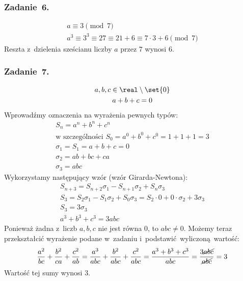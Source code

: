 \subsubsection*{Zadanie~6.}
\begin{gather*}
    a \equiv 3 \pmod{7}\\
    a^3 \equiv 3^3 \equiv 27 \equiv 21 + 6 \equiv 7 \cdot 3 + 6 \pmod{7}
\end{gather*}
Reszta z~dzielenia sześcianu liczby \(a\) przez \(7\) wynosi \(6\).
\subsubsection*{Zadanie~7.}
\begin{gather*}
    a, b, c \in \real \setminus \set{0}\\
    a + b + c = 0
\end{gather*}
Wprowadźmy oznaczenia na wyrażenia pewnych typów:
\begin{gather*}
    S_n = a^n + b^n + c^n\\
    \text{w~szczególności } S_0 = a^0 + b^0 + c^0 = 1 + 1 + 1 = 3\\
    \sigma_1 = S_1 = a + b + c = 0\\
    \sigma_2 = ab + bc + ca\\
    \sigma_3 = abc
\end{gather*}
Wykorzystamy następujący wzór (wzór Girarda-Newtona):
\begin{gather*}
    S_{n+3} = S_{n+2}\sigma_1 - S_{n+1}\sigma_2 + S_{n}\sigma_3\\
    S_3 = S_2\sigma_1 - S_1\sigma_2 + S_0\sigma_3 = S_2 \cdot 0 + 0 \cdot \sigma_2 + 3\sigma_3\\
    S_3 = 3\sigma_3\\
    a^3 + b^3 + c^3 = 3abc
\end{gather*}
Ponieważ żadna z~liczb \(a, b, c\) nie jest równa \(0\), to \(abc \neq 0\). Możemy teraz przekształcić wyrażenie podane w~zadaniu i~podstawić wyliczoną wartość:
\begin{gather*}
    \frac{a^2}{bc} + \frac{b^2}{ca} + \frac{c^2}{ab}
        = \frac{a^3}{abc} + \frac{b^2}{abc} + \frac{c^2}{abc}
        = \frac{a^3 + b^3 + c^3}{abc}
        = \frac{3\cancel{abc}}{\cancel{abc}}
        = 3
\end{gather*}
Wartość tej sumy wynosi \(3\).

